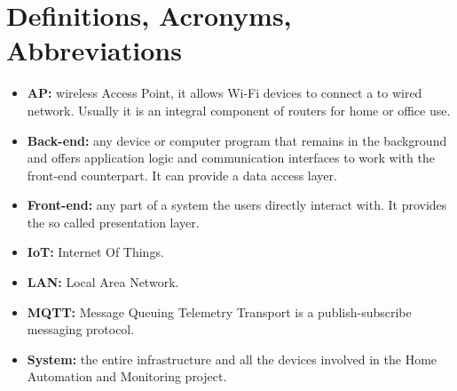 \section{Definitions, Acronyms, Abbreviations}

\begin{itemize}
	\item \textbf{AP:} wireless Access Point, it allows Wi-Fi devices to connect a to wired network. Usually it is an integral component of routers for home or office use.
	\item \textbf{Back-end:} any device or computer program that remains in the background and offers application logic and communication interfaces to work with the front-end counterpart. It can provide a data access layer.
	\item \textbf{Front-end:} any part of a system the users directly interact with. It provides the so called presentation layer.
	\item \textbf{IoT:} Internet Of Things.
	\item \textbf{LAN:} Local Area Network.
	\item \textbf{MQTT:} Message Queuing Telemetry Transport is a publish-subscribe messaging protocol.
	\item \textbf{System:} the entire infrastructure and all the devices involved in the Home Automation and Monitoring project.
\end{itemize}